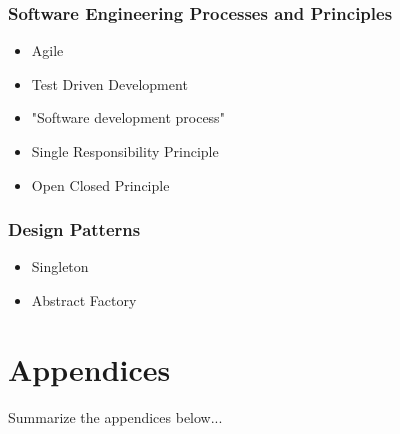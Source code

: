 \toclineskip
\section{Software Engineering Processes and Principles}


\begin{itemize}
	\item Agile
	\item Test Driven Development
	\item "Software development process"
	\item Single Responsibility Principle
	\item Open Closed Principle
\end{itemize}


\toclineskip
\section{Design Patterns}

\begin{itemize}
	\item Singleton
	\item Abstract Factory
\end{itemize}

\newpage


\part*{Appendices}

Summarize the appendices below...

